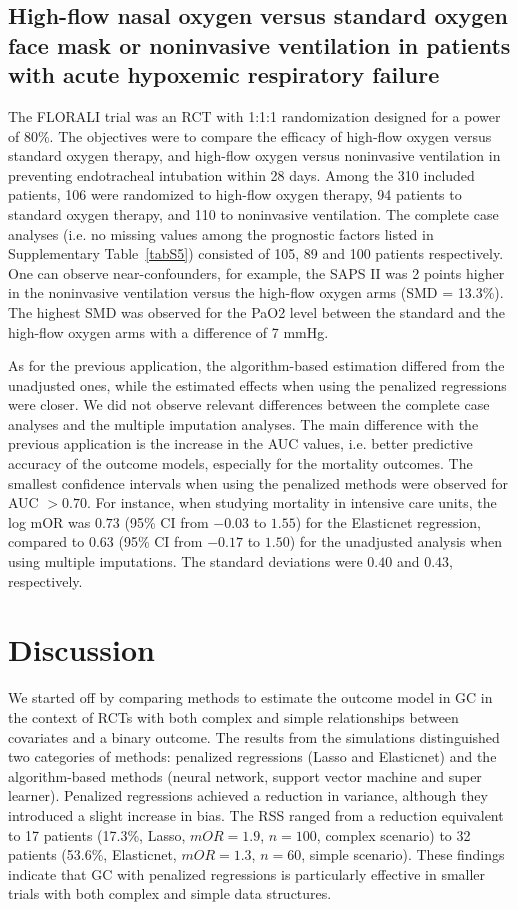 \documentclass{article}
\begin{document}
\subsection{High-flow nasal oxygen versus standard oxygen face mask or noninvasive ventilation in patients with acute hypoxemic respiratory failure}

The FLORALI trial was an RCT with 1:1:1 randomization designed for a power of 80\%.  \cite{frat_high-flow_2015} The objectives were to compare the efficacy of high-flow oxygen versus standard oxygen therapy, and high-flow oxygen versus noninvasive ventilation in preventing endotracheal intubation within 28 days.
Among the 310 included patients,  106 were randomized to high-flow oxygen therapy, 94 patients to standard oxygen therapy, and 110 to noninvasive ventilation. The complete case analyses (i.e. no missing values among the prognostic factors listed in Supplementary Table~\ref{tabS5}) consisted of 105, 89 and 100 patients respectively. One can observe near-confounders, for example, the SAPS II was 2 points higher in the noninvasive ventilation versus the high-flow oxygen arms (SMD = 13.3\%). The highest SMD was observed for the PaO2 level between the standard and the high-flow oxygen arms with a difference of 7 mmHg.

As for the previous application, the algorithm-based estimation differed from the unadjusted ones, while the estimated effects when using the penalized regressions were closer. We did not observe relevant differences between the complete case analyses and the multiple imputation analyses.
The main difference with the previous application is the increase in the AUC values, i.e. better predictive accuracy of the outcome models, especially for the mortality outcomes. The smallest confidence intervals when using the penalized methods were observed for AUC $>0.70$. For instance, when studying mortality in intensive care units, the log mOR was $0.73$ (95\% CI from $-0.03$ to $1.55$) for the Elasticnet regression, compared to $0.63$ (95\% CI from $-0.17$ to $1.50$) for the unadjusted analysis when using multiple imputations. The standard deviations were $0.40$ and $0.43$, respectively. 


\section{Discussion}

We started off by comparing methods to estimate the outcome model in GC in the context of RCTs with both complex and simple relationships between covariates and a binary outcome. The results from the simulations distinguished two categories of methods: penalized regressions (Lasso and Elasticnet) and the algorithm-based methods (neural network, support vector machine and super learner). Penalized regressions achieved a reduction in variance, although they introduced a slight increase in bias. The RSS ranged from a reduction equivalent to 17 patients (17.3\%, Lasso, $mOR=1.9$, $n=100$, complex scenario) to 32 patients (53.6\%, Elasticnet, $mOR=1.3$, $n=60$, simple scenario). These findings indicate that GC with penalized regressions is particularly effective in smaller trials with both complex and simple data structures.
\end{document}
